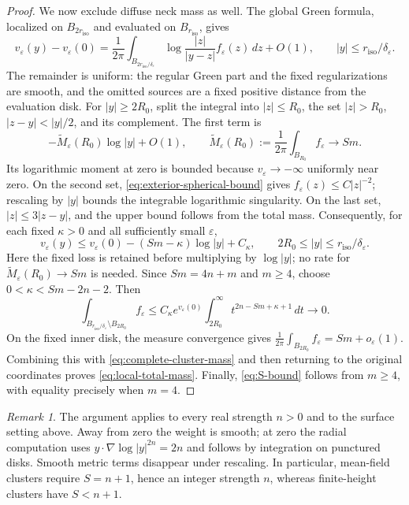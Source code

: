 \documentclass[11pt,reqno]{amsart}
\numberwithin{equation}{section}
\theoremstyle{definition}
\theoremstyle{remark}
\newtheorem{remark}[theorem]{Remark}
\newcommand{\eps}{\varepsilon}
\newcommand{\de}{\delta_{\eps}}
\begin{document}
\begin{proof}
We now exclude diffuse neck mass as well. The global Green formula,
localized on $B_{2r_{\mathrm{iso}}}$ and evaluated on $B_{r_{\mathrm{iso}}}$, gives
\begin{equation}\label{eq:exterior-green-difference}
 v_\eps(y)-v_\eps(0)
 =\frac1{2\pi}\int_{B_{2r_{\mathrm{iso}}/\de}}
       \log\frac{|z|}{|y-z|}f_\eps(z)\,dz+O(1),
 \qquad |y|\le r_{\mathrm{iso}}/\de.
\end{equation}
The remainder is uniform: the regular Green part and the fixed
regularizations are smooth, and the omitted sources are a fixed
positive distance from the evaluation disk. For $|y|\ge2R_0$,
split the integral into $|z|\le R_0$, the set
$|z|>R_0$, $|z-y|<|y|/2$, and its complement. The first term is
\[
 -\widetilde M_\eps(R_0)\log|y|+O(1),\qquad
 \widetilde M_\eps(R_0):=\frac1{2\pi}\int_{B_{R_0}}f_\eps
                          \longrightarrow Sm.
\]
Its logarithmic moment at zero is bounded because
$v_\eps\to-\infty$ uniformly near zero. On the second set,
\eqref{eq:exterior-spherical-bound} gives $f_\eps(z)\le C|z|^{-2}$;
rescaling by $|y|$ bounds the integrable logarithmic singularity.
On the last set, $|z|\le3|z-y|$, and the upper bound follows from
the total mass. Consequently, for each fixed $\kappa>0$ and all
sufficiently small $\eps$,
\begin{equation}\label{eq:exterior-fixed-loss}
 v_\eps(y)\le v_\eps(0)-(Sm-\kappa)\log|y|+C_\kappa,
 \qquad 2R_0\le|y|\le r_{\mathrm{iso}}/\de.
\end{equation}
Here the fixed loss is retained before multiplying by $\log|y|$;
no rate for $\widetilde M_\eps(R_0)\to Sm$ is needed.
Since $Sm=4n+m$ and $m\ge4$, choose
$0<\kappa<Sm-2n-2$. Then
\begin{equation}\label{eq:complete-cluster-mass}
 \int_{B_{r_{\mathrm{iso}}/\de}\setminus B_{2R_0}}f_\eps
 \le C_\kappa e^{v_\eps(0)}
       \int_{2R_0}^\infty t^{2n-Sm+\kappa+1}\,dt
 \longrightarrow0.
\end{equation}
On the fixed inner disk, the measure convergence gives
\(\frac1{2\pi}\int_{B_{2R_0}}f_\eps=Sm+o_\eps(1).\)
Combining this with \eqref{eq:complete-cluster-mass} and then
returning to the original coordinates proves
\eqref{eq:local-total-mass}. Finally, \eqref{eq:S-bound} follows
from $m\ge4$, with equality precisely when $m=4$.
\end{proof}

\begin{remark}
The argument applies to every real strength $n>0$ and to the
surface setting above. Away from zero the weight is smooth; at
zero the radial computation uses
$y\cdot\nabla\log|y|^{2n}=2n$ and follows by integration on
punctured disks. Smooth metric terms disappear under rescaling.
In particular, mean-field clusters require $S=n+1$, hence an
integer strength $n$, whereas finite-height clusters have $S<n+1$.
\end{remark}
\end{document}
